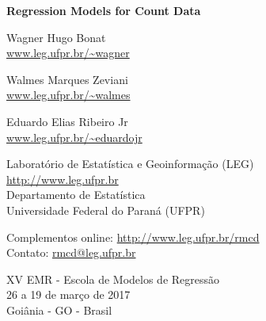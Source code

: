 \thispagestyle{empty}
\cleardoublepage
\thispagestyle{empty}


\begin{flushleft}
  \large \bf
  Regression Models for Count Data
\end{flushleft}

\begin{flushleft}
Wagner Hugo Bonat\\
\url{www.leg.ufpr.br/~wagner}

Walmes Marques Zeviani\\
\url{www.leg.ufpr.br/~walmes}

Eduardo Elias Ribeiro Jr\\
\url{www.leg.ufpr.br/~eduardojr}
\end{flushleft}
\vspace*{2em}

Laboratório de Estatística e Geoinformação (LEG)\\
\url{http://www.leg.ufpr.br}\\
Departamento de Estatística\\
Universidade Federal do Paraná (UFPR)

Complementos online: \url{http://www.leg.ufpr.br/rmcd}\\
Contato: \url{rmcd@leg.ufpr.br}
\vspace*{\fill}

\begin{center}
XV EMR - Escola de Modelos de Regressão\\
26 a 19 de março de 2017\\
Goiânia - GO - Brasil
\end{center}

\clearpage
\thispagestyle{empty}
\pagebreak

\setcounter{page}{1}
